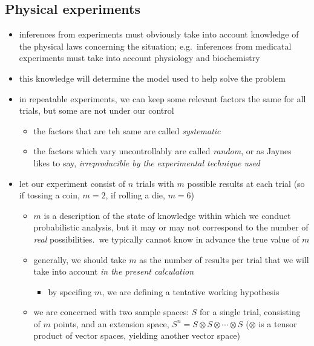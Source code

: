 \documentclass[../jaynes_prob_theory_notes.tex]{subfiles}
\begin{document}
        \subsection{Physical experiments}
            \begin{itemize}
                \item inferences from experiments must obviously take into account knowledge of the physical laws concerning the situation; e.g.\ inferences from medicatal experiments must take into account physiology and biochemistry
                \item this knowledge will determine the model used to help solve the problem
                \item in repeatable experiments, we can keep some relevant factors the same for all trials, but some are not under our control
                    \begin{itemize}
                        \item the factors that are teh same are called \textit{systematic}
                        \item the factors which vary uncontrollably are called \textit{random}, or as Jaynes likes to say, \textit{irreproducible by the experimental technique used}
                    \end{itemize}
                        \item let our experiment consist of $n$ trials with $m$ possible results at each trial (so if tossing a coin, $m=2$, if rolling a die, $m=6$)
                            \begin{itemize}
                        \item $m$ is a description of the state of knowledge within which we conduct probabilistic analysis, but it may or may not correspond to the number of \textit{real} possibilities.\ we typically cannot know in advance the true value of $m$
                        \item generally, we should take $m$ as the number of results per trial that we will take into account \textit{in the present calculation}
                            \begin{itemize}
                                \item by specifing $m$, we are defining a tentative working hypothesis
                            \end{itemize}
                        \item we are concerned with two sample spaces: $S$ for a single trial, consisting of $m$ points, and an extension space, $S^n = S \otimes S \otimes \cdots \otimes S$ ($\otimes$ is a tensor product of vector spaces, yielding another vector space)

\end{itemize}
\end{itemize}
\end{document}
